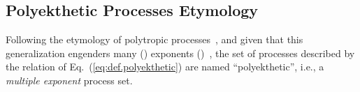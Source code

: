     \subsection{Polyekthetic Processes Etymology}

    Following the etymology of polytropic processes~\cite{2020-NaaktgeborenC-engrXiv}, and given
    that     this     generalization     engenders      many      ()      exponents
    ()~\cite{1997-ManiatoglouMPF-Porto}, the set of processes described  by  the
    relation  of   Eq.~(\ref{eq:def.polyekthetic})   are   named   ``polyekthetic'',   i.e.,   a
    \emph{multiple exponent} process set.


